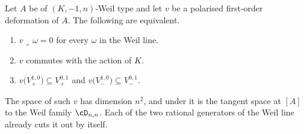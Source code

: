 \begin{proposition}
\label{prop:firstorder}
Let $A$ be of $(K,-1,n)$-Weil type and let $v$ be a polarised first-order
deformation of $A$. The following are equivalent.
\begin{enumerate}[label=\textup{(\roman*)},nosep]
\item $v\lrcorner\,\omega=0$ for every $\omega$ in the Weil line.
\item $v$ commutes with the action of $K$.
\item $v\bigl(V_{+}^{1,0}\bigr)\subseteq V_{+}^{0,1}$ and
  $v\bigl(V_{-}^{1,0}\bigr)\subseteq V_{-}^{0,1}$.
\end{enumerate}
The space of such $v$ has dimension $n^{2}$, and under
 it is the tangent space at $[A]$ to the Weil family
$\cD_{n,n}$. Each of the two rational generators of the Weil line already
cuts it out by itself.
\end{proposition}

